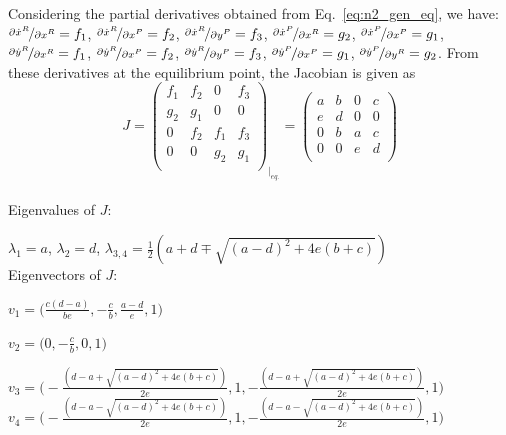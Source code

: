 \documentclass[12pt]{article}
\begin{document}
Considering the partial derivatives obtained from 
Eq.~\ref{eq:n2_gen_eq}, we have:
$\nicefrac{\partial \dot{x}^R}{\partial {x}^R} = f_1$,
$\nicefrac{\partial \dot{x}^R}{\partial {x}^P} = f_2$,
$\nicefrac{\partial \dot{x}^R}{\partial {y}^P} = f_3$,
$\nicefrac{\partial \dot{x}^P}{\partial {x}^R} = g_2$,
$\nicefrac{\partial \dot{x}^P}{\partial {x}^P} = g_1$,
$\nicefrac{\partial \dot{y}^R}{\partial {x}^R} = f_1$,
$\nicefrac{\partial \dot{y}^R}{\partial {x}^P} = f_2$,
$\nicefrac{\partial \dot{y}^R}{\partial {y}^P} = f_3$,
$\nicefrac{\partial \dot{y}^P}{\partial {x}^P} = g_1$,
$\nicefrac{\partial \dot{y}^P}{\partial {y}^R} = g_2$.
From these derivatives at the equilibrium point, the 
Jacobian is given as
\begin{equation}
    J = \begin{pmatrix}
        f_1 & f_2 & 0 & f_3 \\
        g_2 & g_1 & 0 & 0 \\
        0 & f_2 & f_1 & f_3 \\
        0 & 0 & g_2 & g_1 \\
    \end{pmatrix}_{\big|_{eq.}} =
    \begin{pmatrix}
        a & b & 0 & c \\
        e & d & 0 & 0 \\
        0 & b & a & c \\
        0 & 0 & e & d \\ 
    \end{pmatrix}
\end{equation}\\[0.2cm]

Eigenvalues of $J$:

$\lambda_1 = a$, $\lambda_2 = d$, 
$\lambda_{3,4} = \frac{1}{2}(a+d \mp \sqrt{(a-d)^2 + 4e(b+c)})$\\[0.2cm]

Eigenvectors of $J$:

$ v_1 = \Big( \frac{c(d-a)}{be}, -\frac{c}{b}, \frac{a-d}{e}, 1 \Big)$

$ v_2 = \Big( 0, -\frac{c}{b}, 0, 1 \Big)$

$ v_3 = \Big( -\frac{(d - a + \sqrt{(a-d)^2 + 4e(b+c)})}{2e}, 
        1, -\frac{(d - a + \sqrt{(a-d)^2 + 4e(b+c)})}{2e}, 1 \Big)$\\[0.2cm]

$ v_4 = \Big( -\frac{(d - a - \sqrt{(a-d)^2 + 4e(b+c)})}{2e}, 
        1, -\frac{(d - a - \sqrt{(a-d)^2 + 4e(b+c)})}{2e}, 1 \Big)$\\[0.2cm]
\end{document}
